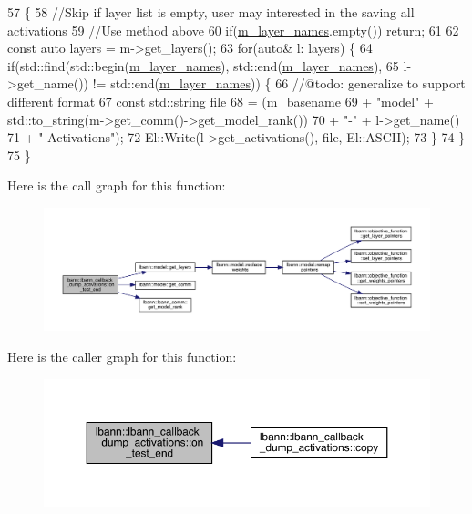 \begin{DoxyCode}
57                                                           \{
58   \textcolor{comment}{//Skip if layer list is empty, user may interested in the saving all activations}
59   \textcolor{comment}{//Use method above }
60   \textcolor{keywordflow}{if}(\hyperlink{classlbann_1_1lbann__callback__dump__activations_aac56e32b6bef7923046c408f3a2dc857}{m\_layer\_names}.empty()) \textcolor{keywordflow}{return};
61 
62   \textcolor{keyword}{const} \textcolor{keyword}{auto} layers = m->get\_layers();
63   \textcolor{keywordflow}{for}(\textcolor{keyword}{auto}& l: layers) \{
64     \textcolor{keywordflow}{if}(std::find(std::begin(\hyperlink{classlbann_1_1lbann__callback__dump__activations_aac56e32b6bef7923046c408f3a2dc857}{m\_layer\_names}), std::end(\hyperlink{classlbann_1_1lbann__callback__dump__activations_aac56e32b6bef7923046c408f3a2dc857}{m\_layer\_names}),
65                   l->get\_name()) != std::end(\hyperlink{classlbann_1_1lbann__callback__dump__activations_aac56e32b6bef7923046c408f3a2dc857}{m\_layer\_names})) \{
66       \textcolor{comment}{//@todo: generalize to support different format}
67       \textcolor{keyword}{const} std::string file
68         = (\hyperlink{classlbann_1_1lbann__callback__dump__activations_a5775d9317de386e07cbd137122db6ee6}{m\_basename}
69            + \textcolor{stringliteral}{"model"} + std::to\_string(m->get\_comm()->get\_model\_rank())
70            + \textcolor{stringliteral}{"-"} + l->get\_name()
71            + \textcolor{stringliteral}{"-Activations"});
72        El::Write(l->get\_activations(), file, El::ASCII);
73       \}
74     \}
75 \}
\end{DoxyCode}
Here is the call graph for this function\+:\nopagebreak
\begin{figure}[H]
\begin{center}
\leavevmode
\includegraphics[width=350pt]{classlbann_1_1lbann__callback__dump__activations_a5c93f4455b743e3f61600bf092a6d93c_cgraph}
\end{center}
\end{figure}
Here is the caller graph for this function\+:\nopagebreak
\begin{figure}[H]
\begin{center}
\leavevmode
\includegraphics[width=350pt]{classlbann_1_1lbann__callback__dump__activations_a5c93f4455b743e3f61600bf092a6d93c_icgraph}
\end{center}
\end{figure}
